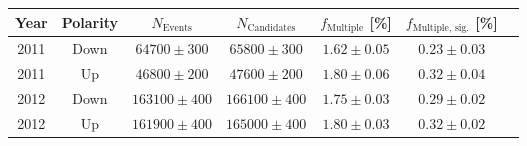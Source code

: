 \begin{tabular}{ccccccc}
  \toprule
  Year & Polarity & $N_{\text{Events}}$ & $N_{\text{Candidates}}$ & $f_{\text{Multiple}}$ [\si{\percent}] & $f_{\text{Multiple, sig.}}$ [\si{\percent}] \\
  \midrule
2011   & Down     & $64700 \pm 300$     & $65800 \pm 300$         & $1.62 \pm 0.05$                       & $0.23 \pm 0.03$                             \\
2011   & Up       & $46800 \pm 200$     & $47600 \pm 200$         & $1.80 \pm 0.06$                       & $0.32 \pm 0.04$                             \\
2012   & Down     & $163100 \pm 400$    & $166100 \pm 400$        & $1.75 \pm 0.03$                       & $0.29 \pm 0.02$                             \\
2012   & Up       & $161900 \pm 400$    & $165000 \pm 400$        & $1.80 \pm 0.03$                       & $0.32 \pm 0.02$                             \\
  \bottomrule
\end{tabular}
